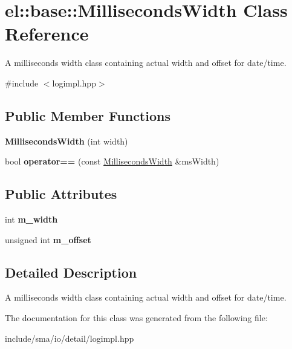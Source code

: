 \hypertarget{classel_1_1base_1_1MillisecondsWidth}{\section{el\-:\-:base\-:\-:Milliseconds\-Width Class Reference}
\label{classel_1_1base_1_1MillisecondsWidth}
}


A milliseconds width class containing actual width and offset for date/time.  




{\ttfamily \#include $<$logimpl.\-hpp$>$}

\subsection*{Public Member Functions}
\begin{DoxyCompactItemize}
\item 
\hypertarget{classel_1_1base_1_1MillisecondsWidth_a358fa0fcdd4076c4038ecdfc206de38a}{{\bfseries Milliseconds\-Width} (int width)}\label{classel_1_1base_1_1MillisecondsWidth_a358fa0fcdd4076c4038ecdfc206de38a}

\item 
\hypertarget{classel_1_1base_1_1MillisecondsWidth_a60f5fb6e31216d1268585b98d20517ff}{bool {\bfseries operator==} (const \hyperlink{classel_1_1base_1_1MillisecondsWidth}{Milliseconds\-Width} \&ms\-Width)}\label{classel_1_1base_1_1MillisecondsWidth_a60f5fb6e31216d1268585b98d20517ff}

\end{DoxyCompactItemize}
\subsection*{Public Attributes}
\begin{DoxyCompactItemize}
\item 
\hypertarget{classel_1_1base_1_1MillisecondsWidth_a31c468b0323d376505c4975720c7b66e}{int {\bfseries m\-\_\-width}}\label{classel_1_1base_1_1MillisecondsWidth_a31c468b0323d376505c4975720c7b66e}

\item 
\hypertarget{classel_1_1base_1_1MillisecondsWidth_a0e98edbecf602a915d4d609747c52669}{unsigned int {\bfseries m\-\_\-offset}}\label{classel_1_1base_1_1MillisecondsWidth_a0e98edbecf602a915d4d609747c52669}

\end{DoxyCompactItemize}


\subsection{Detailed Description}
A milliseconds width class containing actual width and offset for date/time. 

The documentation for this class was generated from the following file\-:\begin{DoxyCompactItemize}
\item 
include/sma/io/detail/logimpl.\-hpp\end{DoxyCompactItemize}
